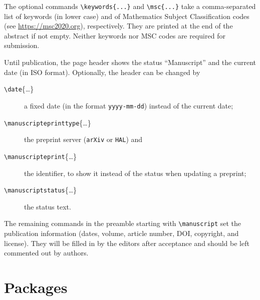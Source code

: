 \documentclass[english,review]{jnsao}
\newcommand{\cs}[1]{\texttt{\textbackslash#1}}
\begin{document}
The optional commands \verb!\keywords{...}! and \verb!\msc{...}! take a comma-separated list of keywords (in lower case) and of Mathematics Subject Classification codes (see \url{https://msc2020.org}), respectively. They are printed at the end of the abstract if not empty. Neither keywords nor MSC codes are required for submission.

Until publication, the page header shows the status ``Manuscript'' and the current date (in ISO format). Optionally, the header can be changed by
\begin{description}
    \item[\cs{date}\{\dots\}] a fixed date (in the format \texttt{yyyy-mm-dd}) instead of the current date;
    \item[\cs{manuscripteprinttype}\{\dots\}] the preprint server (\texttt{arXiv} or \texttt{HAL}) and
    \item[\cs{manuscripteprint}\{\dots\}] the identifier, to show it instead of the status when updating a preprint;
    \item[\cs{manuscriptstatus}\{\dots\}] the status text.
\end{description}
The remaining commands in the preamble starting with \cs{manuscript} set the publication information (dates, volume, article number, DOI, copyright, and license). They will be filled in by the editors after acceptance and should be left commented out by authors.

\section{Packages}\label{sec:packages}
\end{document}
